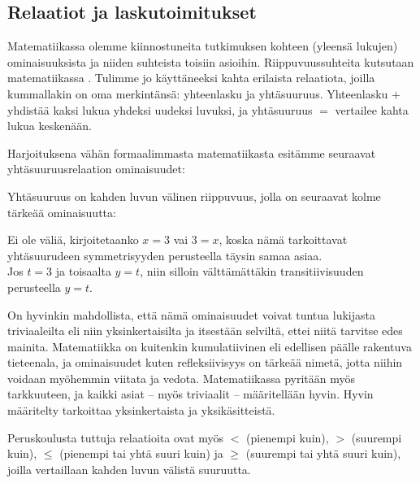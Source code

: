 \subsection*{Relaatiot ja laskutoimitukset}

Matematiikassa olemme kiinnostuneita tutkimuksen kohteen (yleensä lukujen) ominaisuuksista ja niiden suhteista toisiin asioihin. Riippuvuussuhteita kutsutaan matematiikassa . Tulimme jo käyttäneeksi kahta erilaista relaatiota, joilla kummallakin on oma merkintänsä: yhteenlasku ja yhtäsuuruus. Yhteenlasku $+$ yhdistää kaksi lukua yhdeksi uudeksi luvuksi, ja yhtäsuuruus $=$ vertailee kahta lukua keskenään.

Harjoituksena vähän formaalimmasta matematiikasta esitämme seuraavat yhtäsuuruusrelaation ominaisuudet:

Yhtäsuuruus on kahden luvun välinen riippuvuus, jolla on seuraavat kolme tärkeää ominaisuutta:


\begin{esimerkki}
Ei ole väliä, kirjoitetaanko $x=3$ vai $3=x$, koska nämä tarkoittavat yhtäsuurudeen symmetrisyyden perusteella täysin samaa asiaa.\\
Jos $t=3$ ja toisaalta $y=t$, niin silloin välttämättäkin transitiivisuuden perusteella $y=t$.
\end{esimerkki}

On hyvinkin mahdollista, että nämä ominaisuudet voivat tuntua lukijasta triviaaleilta eli niin yksinkertaisilta ja itsestään selviltä, ettei niitä tarvitse edes mainita. Matematiikka on kuitenkin kumulatiivinen eli edellisen päälle rakentuva tieteenala, ja ominaisuudet kuten refleksiivisyys on tärkeää nimetä, jotta niihin voidaan myöhemmin viitata ja vedota. Matematiikassa pyritään myös tarkkuuteen, ja kaikki asiat – myös triviaalit – määritellään hyvin. Hyvin määritelty tarkoittaa yksinkertaista ja yksikäsitteistä.

Peruskoulusta tuttuja relaatioita ovat myös $<$ (pienempi kuin), $>$ (suurempi kuin), $\leq$ (pienempi tai yhtä suuri kuin) ja $\geq$ (suurempi tai yhtä suuri kuin), joilla vertaillaan kahden luvun välistä suuruutta.

